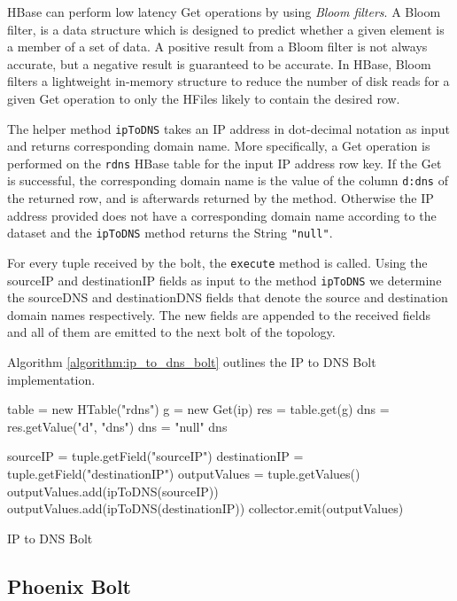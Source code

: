 HBase can perform low latency Get operations by using \emph{Bloom filters}. A Bloom filter, is a data structure which is designed to predict whether a given element is a member of a set of data. A positive result from a Bloom filter is not always accurate, but a negative result is guaranteed to be accurate. In HBase, Bloom filters a lightweight in-memory structure to reduce the number of disk reads for a given Get operation to only the HFiles likely to contain the desired row.

The helper method \texttt{ipToDNS} takes an IP address in dot-decimal notation as input and returns corresponding domain name. More specifically, a Get operation is performed on the \texttt{rdns} HBase table for the input IP address row key. If the Get is successful, the corresponding domain name is the value of the column \texttt{d:dns} of the returned row, and is afterwards returned by the method. Otherwise the IP address provided does not have a corresponding domain name according to the dataset and the \texttt{ipToDNS} method returns the String \texttt{"null"}.

For every tuple received by the bolt, the \texttt{execute} method is called.  Using the sourceIP and destinationIP fields as input to the method \texttt{ipToDNS} we determine the sourceDNS and destinationDNS fields that denote the source and destination domain names respectively. The new fields are appended to the received fields and all of them are emitted to the next bolt of the topology.

Algorithm \ref{algorithm:ip_to_dns_bolt} outlines the IP to DNS Bolt implementation. 

\begin{algorithm}[H]
\begin{algorithmic}[1]
\State table = new HTable("rdns")
\State g = new Get(ip)
\State res = table.get(g)
\State dns = res.getValue("d", "dns")
\State dns = "null"
\EndIf
\Return dns
\EndFunction

\State sourceIP = tuple.getField("sourceIP")
\State destinationIP = tuple.getField("destinationIP")
\State outputValues = tuple.getValues()
\State outputValues.add(ipToDNS(sourceIP))
\State outputValues.add(ipToDNS(destinationIP))
\State collector.emit(outputValues)
\EndFunction
\end{algorithmic}
\caption{IP to DNS Bolt}
\label{algorithm:ip_to_dns_bolt}
\end{algorithm}

\subsection{Phoenix Bolt}

